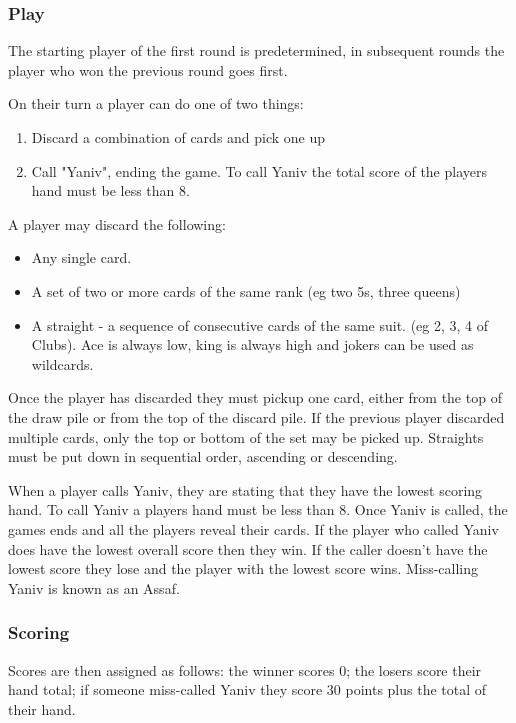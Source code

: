 \documentclass[../main.tex]{subfiles}
\begin{document}
\subsubsection{Play}
The starting player of the first round is predetermined, in subsequent rounds the player who won the previous round goes first. 

On their turn a player can do one of two things:
\begin{enumerate}[nosep]
    \item Discard a combination of cards and pick one up
    \item Call "Yaniv", ending the game. To call Yaniv the total score of the players hand must be less than 8.
\end{enumerate}

A player may discard the following:
\begin{itemize}[nosep]
    \item Any single card.
    \item A set of two or more cards of the same rank (eg two 5s, three queens)
    \item A straight - a sequence of consecutive cards of the same suit. (eg 2, 3, 4 of Clubs). Ace is always low, king is always high and jokers can be used as wildcards.
\end{itemize}

Once the player has discarded they must pickup one card, either from the top of the draw pile or from the top of the discard pile. If the previous player discarded multiple cards, only the top or bottom of the set may be picked up. Straights must be put down in sequential order, ascending or descending. 

When a player calls Yaniv, they are stating that they have the lowest scoring hand. To call Yaniv a players hand must be less than 8. Once Yaniv is called, the games ends and all the players reveal their cards. If the player who called Yaniv does have the lowest overall score then they win. If the caller doesn't have the lowest score they lose and the player with the lowest score wins. Miss-calling Yaniv is known as an Assaf.

\subsubsection{Scoring}

Scores are then assigned as follows: the winner scores 0; the losers score their hand total; if someone miss-called Yaniv they score 30 points plus the total of their hand. 
\end{document}
